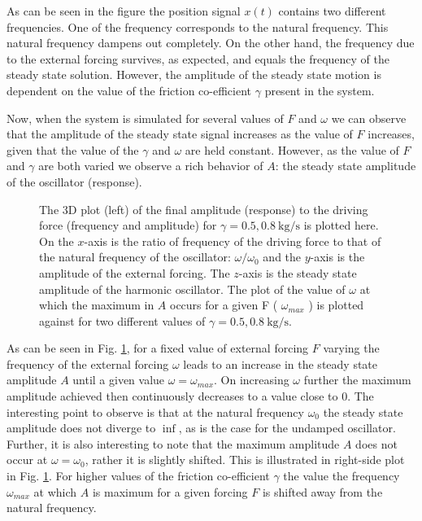 \documentclass[10pt]{article}
\begin{document}
As can be seen in the figure the position signal $x(t)$ contains two different frequencies. One of the frequency corresponds to the natural frequency. This natural frequency dampens out completely. On the other hand, the frequency due to the external forcing survives, as expected, and equals the frequency of the steady state solution. However, the amplitude of the steady state motion is dependent on the value of the friction co-efficient $\gamma$ present in the system. 

Now, when the system is simulated for several values of $F$ and $\omega$ we can observe that the amplitude of the steady state signal increases as the value of $F$ increases, given that the value of the $\gamma$ and $\omega$ are held constant. However, as the value of $F$ and $\gamma$ are both varied we observe a rich behavior of $A$: the steady state amplitude of the oscillator (response). 

\begin{figure}[!htb]
\begin{subfigure}{.5\textwidth}
  \centering
  
\end{subfigure}%
\begin{subfigure}{.5\textwidth}
  \centering
  
\end{subfigure}
\caption{The 3D plot (left) of the final amplitude (response) to the driving force (frequency and amplitude) for  $\gamma=0.5, 0.8\ \mathrm{kg/s}$ is plotted here. On the $x$-axis is the ratio of frequency of the driving force to that of the natural frequency of the oscillator: $\omega/\omega_{0}$ and the $y$-axis is the amplitude of the external forcing. The $z$-axis is the steady state amplitude of the harmonic oscillator. The plot of the value of $\omega$ at which the maximum in $A$ occurs for a given F ( $\omega_{max}$ ) is plotted against for two different values of $\gamma=0.5, 0.8\ \mathrm{kg/s}$. }
\label{fig:q15_A_vs_omg_F}
\end{figure}

As can be seen in Fig. \ref{fig:q15_A_vs_omg_F}, for a fixed value of external forcing $F$ varying the frequency of the external forcing $\omega$ leads to an increase in the steady state amplitude $A$ until a given value $\omega = \omega_{max}$. On increasing $\omega$ further the maximum amplitude achieved then continuously decreases to a value close to 0. The interesting point to observe is that at the natural frequency $\omega_{0}$ the steady state amplitude does not diverge to $\inf$, as is the case for the undamped oscillator. Further, it is also interesting to note that the maximum amplitude $A$ does not occur at $\omega=\omega_{0}$, rather it is slightly shifted. This is illustrated in right-side plot in Fig. \ref{fig:q15_A_vs_omg_F}. For higher values of the friction co-efficient $\gamma$ the value the frequency $\omega_{max}$ at which $A$ is maximum for a given forcing $F$ is shifted away from the natural frequency. 
\end{document}
